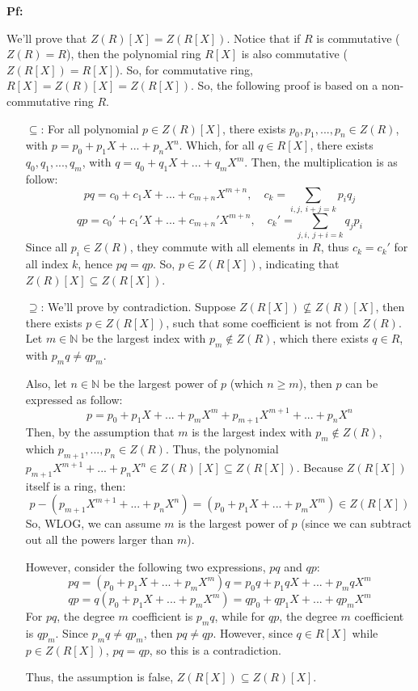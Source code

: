 \documentclass{article}
\begin{document}
\textbf{Pf:}

We'll prove that $Z(R)[X]=Z(R[X])$. Notice that if $R$ is commutative ($Z(R)=R$), then the polynomial ring $R[X]$ is also commutative ($Z(R[X])=R[X]$).
So, for commutative ring, $R[X]=Z(R)[X]=Z(R[X])$. So, the following proof is based on a non-commutative ring $R$.

\begin{itemize}
    \item[$\subseteq$:] For all polynomial $p\in Z(R)[X]$, there exists $p_0,p_1,...,p_n\in Z(R)$, with $p = p_0+p_1X+...+p_nX^n$.
    Which, for all $q\in R[X]$, there exists $q_0,q_1,...,q_m$, with $q = q_0+q_1X+...+q_mX^m$.
    Then, the multiplication is as follow:
    $$pq = c_0+c_1X+...+c_{m+n}X^{m+n},\quad c_k=\sum_{i,j,\ i+j=k}p_iq_j$$
    $$qp = c_0'+c_1'X+...+c_{m+n}'X^{m+n},\quad c_k' = \sum_{j,i,\ j+i=k}q_jp_i$$
    Since all $p_i\in Z(R)$, they commute with all elements in $R$, thus $c_k = c_k'$ for all index $k$,
    hence $pq=qp$. So, $p\in Z(R[X])$, indicating that $Z(R)[X]\subseteq Z(R[X])$.

    \hfill
    
    \item[$\supseteq$:] We'll prove by contradiction. Suppose $Z(R[X])\not\subseteq Z(R)[X]$, then there exists $p\in Z(R[X])$, such that some coefficient
    is not from $Z(R)$. Let $m\in\mathbb{N}$ be the largest index with $p_m\notin Z(R)$, which there exists $q\in R$, with $p_mq \neq qp_m$.

    Also, let $n\in\mathbb{N}$ be the largest power of $p$ (which $n \geq m$), then $p$ can be expressed as follow:
    $$p=p_0+p_1X+...+p_mX^m+p_{m+1}X^{m+1}+...+p_nX^n$$
    Then, by the assumption that $m$ is the largest index with $p_m\notin Z(R)$, which $p_{m+1},...,p_{n}\in Z(R)$.
    Thus, the polynomial $p_{m+1}X^{m+1}+...+p_nX^n\in Z(R)[X] \subseteq Z(R[X])$. Because $Z(R[X])$ itself is a ring, then:
    $$p-(p_{m+1}X^{m+1}+...+p_nX^n) = (p_0+p_1X+...+p_mX^m)\in Z(R[X])$$
    So, WLOG, we can assume $m$ is the largest power of $p$ (since we can subtract out all the powers larger than $m$).

    \hfill

    However, consider the following two expressions, $pq$ and $qp$:
    $$pq = (p_0+p_1X+...+p_mX^m)q = p_0q+p_1qX+...+p_mqX^m$$
    $$qp = q(p_0+p_1X+...+p_mX^m) = qp_0+qp_1X+...+qp_mX^m$$
    For $pq$, the degree $m$ coefficient is $p_mq$, while for $qp$, the degree $m$ coefficient is $qp_m$.
    Since $p_mq\neq qp_m$, then $pq\neq qp$. However, since $q\in R[X]$ while $p\in Z(R[X])$, $pq=qp$,
    so this is a contradiction.

    Thus, the assumption is false, $Z(R[X])\subseteq Z(R)[X]$.
\end{itemize}
\end{document}
